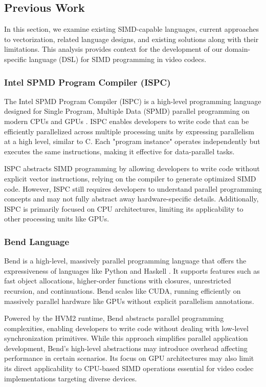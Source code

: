 \documentclass[12pt,a4paper]{article}
\begin{document}
\subsection{Previous Work}

In this section, we examine existing SIMD-capable languages, current approaches to vectorization, related language designs, and existing solutions along with their limitations. This analysis provides context for the development of our domain-specific language (DSL) for SIMD programming in video codecs.

\subsubsection{Intel SPMD Program Compiler (ISPC)}

The Intel SPMD Program Compiler (ISPC) is a high-level programming language designed for Single Program, Multiple Data (SPMD) parallel programming on modern CPUs and GPUs \citep{Pharr2012ISPC}. ISPC enables developers to write code that can be efficiently parallelized across multiple processing units by expressing parallelism at a high level, similar to C. Each "program instance" operates independently but executes the same instructions, making it effective for data-parallel tasks.

ISPC abstracts SIMD programming by allowing developers to write code without explicit vector instructions, relying on the compiler to generate optimized SIMD code. However, ISPC still requires developers to understand parallel programming concepts and may not fully abstract away hardware-specific details. Additionally, ISPC is primarily focused on CPU architectures, limiting its applicability to other processing units like GPUs.

\subsubsection{Bend Language}

Bend is a high-level, massively parallel programming language that offers the expressiveness of languages like Python and Haskell \citep{Bend2021}. It supports features such as fast object allocations, higher-order functions with closures, unrestricted recursion, and continuations. Bend scales like CUDA, running efficiently on massively parallel hardware like GPUs without explicit parallelism annotations.

Powered by the HVM2 runtime, Bend abstracts parallel programming complexities, enabling developers to write code without dealing with low-level synchronization primitives. While this approach simplifies parallel application development, Bend's high-level abstractions may introduce overhead affecting performance in certain scenarios. Its focus on GPU architectures may also limit its direct applicability to CPU-based SIMD operations essential for video codec implementations targeting diverse devices.
\end{document}
